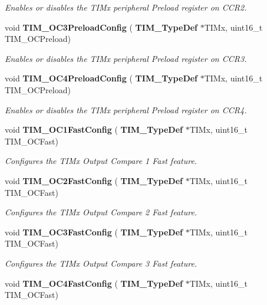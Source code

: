 \begin{DoxyCompactItemize}
\begin{DoxyCompactList}\small\item\em Enables or disables the T\+I\+Mx peripheral Preload register on C\+C\+R2. \end{DoxyCompactList}\item 
void \textbf{ T\+I\+M\+\_\+\+O\+C3\+Preload\+Config} (\textbf{ T\+I\+M\+\_\+\+Type\+Def} $\ast$T\+I\+Mx, uint16\+\_\+t T\+I\+M\+\_\+\+O\+C\+Preload)
\begin{DoxyCompactList}\small\item\em Enables or disables the T\+I\+Mx peripheral Preload register on C\+C\+R3. \end{DoxyCompactList}\item 
void \textbf{ T\+I\+M\+\_\+\+O\+C4\+Preload\+Config} (\textbf{ T\+I\+M\+\_\+\+Type\+Def} $\ast$T\+I\+Mx, uint16\+\_\+t T\+I\+M\+\_\+\+O\+C\+Preload)
\begin{DoxyCompactList}\small\item\em Enables or disables the T\+I\+Mx peripheral Preload register on C\+C\+R4. \end{DoxyCompactList}\item 
void \textbf{ T\+I\+M\+\_\+\+O\+C1\+Fast\+Config} (\textbf{ T\+I\+M\+\_\+\+Type\+Def} $\ast$T\+I\+Mx, uint16\+\_\+t T\+I\+M\+\_\+\+O\+C\+Fast)
\begin{DoxyCompactList}\small\item\em Configures the T\+I\+Mx Output Compare 1 Fast feature. \end{DoxyCompactList}\item 
void \textbf{ T\+I\+M\+\_\+\+O\+C2\+Fast\+Config} (\textbf{ T\+I\+M\+\_\+\+Type\+Def} $\ast$T\+I\+Mx, uint16\+\_\+t T\+I\+M\+\_\+\+O\+C\+Fast)
\begin{DoxyCompactList}\small\item\em Configures the T\+I\+Mx Output Compare 2 Fast feature. \end{DoxyCompactList}\item 
void \textbf{ T\+I\+M\+\_\+\+O\+C3\+Fast\+Config} (\textbf{ T\+I\+M\+\_\+\+Type\+Def} $\ast$T\+I\+Mx, uint16\+\_\+t T\+I\+M\+\_\+\+O\+C\+Fast)
\begin{DoxyCompactList}\small\item\em Configures the T\+I\+Mx Output Compare 3 Fast feature. \end{DoxyCompactList}\item 
void \textbf{ T\+I\+M\+\_\+\+O\+C4\+Fast\+Config} (\textbf{ T\+I\+M\+\_\+\+Type\+Def} $\ast$T\+I\+Mx, uint16\+\_\+t T\+I\+M\+\_\+\+O\+C\+Fast)

\end{DoxyCompactItemize}

